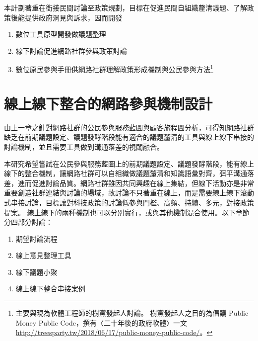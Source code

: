 \documentclass[12pt,a4paper]{article}
\begin{document}
本計劃著重在銜接民間討論至政策規劃，目標在促進民間自組織釐清議題、了解政策後能提供政府洞見與訴求，因而開發
\begin{enumerate}
\item 數位工具原型開發做議題整理
\item 線下討論促進網路社群參與政策討論
\item 數位原民參與手冊供網路社群理解政策形成機制與公民參與方法\footnote{主要與現為軟體工程師的樹黨發起人討論。 樹黨發起人之目的為倡議 Public Money Public Code，撰有〈二十年後的政府軟體〉一文 \url{http://treesparty.tw/2018/06/17/public-money-public-code/}。\label{org2853c6b}}
\end{enumerate}

\section{線上線下整合的網路參與機制設計 }
\label{sec:org23e74d6}

由上一章之針對網路社群的公民參與服務藍圖與顧客旅程圖分析，可得知網路社群缺乏在前期議題設定、議題發酵階段能有適合的議題釐清的工具與線上線下串接的討論機制，並且需要工具做到溝通落差的視閾融合。

本研究希望嘗試在公民參與服務藍圖上的前期議題設定、議題發酵階段，能有線上線下的整合機制，讓網路社群可以自組織做議題釐清和知識語彙對齊，弭平溝通落差，進而促進討論品質。網路社群雖因共同興趣在線上集結，但線下活動亦是非常重要創造社群連結與討論的場域，故討論不只著重在線上，而是需要線上線下滾動式串接討論，目標讓對科技政策的討論低參與門檻、高頻、持續、多元，對接政策提案。 線上線下的兩種機制也可以分別實行，或與其他機制混合使用。以下章節分四部分討論：

\begin{enumerate}
\item 期望討論流程
\item 線上意見整理工具
\item 線下議題小聚
\item 線上線下整合串接案例
\end{enumerate}
\end{document}
